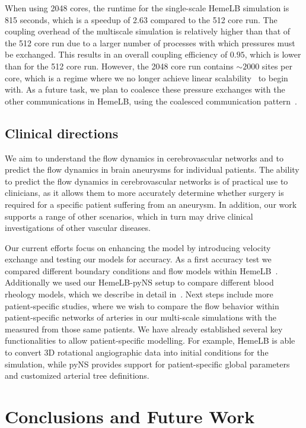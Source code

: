 \documentclass[a4,10pt]{article}
\begin{document}
When using 2048 cores, the runtime for the single-scale HemeLB simulation is
815 seconds, which is a speedup of 2.63 compared to the 512 core run. The
coupling overhead of the multiscale simulation is relatively higher than that
of the 512 core run due to a larger number of processes with which pressures
must be exchanged.  This results in an overall coupling efficiency of $0.95$,
which is lower than for the 512 core run. However, the 2048 core run contains
$\sim2000$ sites per core, which is a regime where we no longer achieve linear
scalability~\cite{Groen:2012} to begin with. As a future task, we plan to
coalesce these pressure exchanges with the other communications in HemeLB,
using the coalesced communication pattern~\cite{Carver:2012-2}.



\subsection{Clinical directions}

We aim to understand the flow dynamics in cerebrovascular networks and to predict
the flow dynamics in brain aneurysms for individual patients. The ability to 
predict the flow dynamics in cerebrovascular networks is of practical use to 
clinicians, as it allows them to more accurately determine whether surgery is 
required for a specific patient suffering from an aneurysm. In addition, our 
work supports a range of other scenarios, which in turn may drive clinical 
investigations of other vascular diseases.

Our current efforts focus on enhancing the model by introducing velocity
exchange and testing our models for accuracy. As a first accuracy test we
compared different boundary conditions and flow models within
HemeLB~\cite{Carver:2012}. Additionally we used our HemeLB-pyNS setup to
compare different blood rheology models, which we describe in detail
in~\cite{Bernabeu:2012}. Next steps include more patient-specific studies,
where we wish to compare the flow behavior within patient-specific networks of
arteries in our multi-scale simulations with the measured from those same
patients. We have already established several key functionalities to allow
patient-specific modelling. For example, HemeLB is able to convert 3D
rotational angiographic data into initial conditions for the simulation, while
pyNS provides support for patient-specific global parameters and customized
arterial tree definitions.  

\section{Conclusions and Future Work}\label{Sec:conc}
\end{document}
